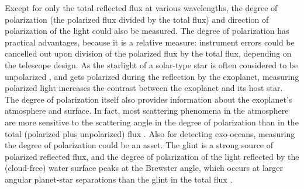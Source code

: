 \documentclass[
    usenatbib,
]{mnras}
\begin{document}
Except for only the total reflected flux at various wavelengths, the degree of polarization (the polarized flux divided by the total flux) and direction of polarization of the light could also be measured. The degree of polarization has practical advantages, because it is a relative measure: instrument errors could be cancelled out upon division of the polarized flux by the total flux, depending on the telescope design. As the starlight of a solar-type star is often considered to be unpolarized \citep{kemp1987}, and gets polarized during the reflection by the exoplanet, measuring polarized light increases the contrast between the exoplanet and its host star. The degree of polarization itself also provides information about the exoplanet's atmosphere and surface. In fact, most scattering phenomena in the atmosphere are more sensitive to the scattering angle in the degree of polarization than in the total (polarized plus unpolarized) flux \citep{hansentravis1974}. Also for detecting exo-oceans, measuring the degree of polarization could be an asset. The glint is a strong source of polarized reflected flux, and the degree of polarization of the light reflected by the (cloud-free) water surface peaks at the Brewster angle, which occurs at larger angular planet-star separations than the glint in the total flux \citep[see e.g.][]{Zugger_2010,treesandstam2019}. 
 
\end{document}

